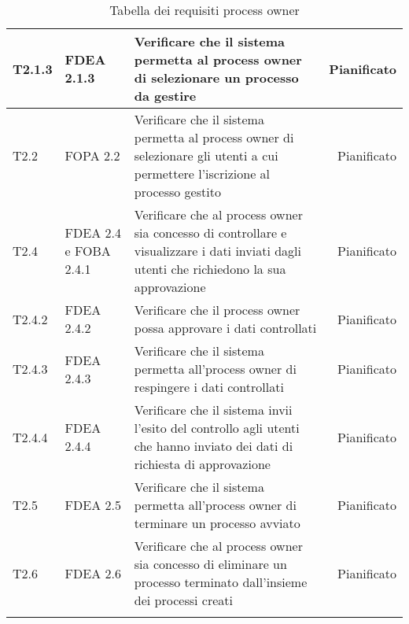 \begin{longtable}{llXr}
\midrule
T2.1.3&FDEA 2.1.3&Verificare che il sistema permetta al process owner di selezionare un processo da gestire&Pianificato\\
\midrule
T2.2&FOPA 2.2&Verificare che il sistema permetta al process owner di selezionare gli utenti a cui permettere l'iscrizione al processo gestito&Pianificato\\
\midrule
T2.4&FDEA 2.4 e FOBA 2.4.1&Verificare che al process owner sia concesso di controllare e visualizzare i dati inviati dagli utenti che richiedono la sua approvazione& Pianificato\\
\midrule
T2.4.2&FDEA 2.4.2&Verificare che il process owner possa approvare i dati controllati&Pianificato\\
\midrule
T2.4.3&FDEA 2.4.3&Verificare che il sistema permetta all'process owner di respingere i dati controllati&Pianificato\\
\midrule
T2.4.4&FDEA 2.4.4&Verificare che il sistema invii l'esito del controllo agli utenti che hanno inviato dei dati di richiesta di approvazione&Pianificato\\
\midrule
T2.5&FDEA 2.5&Verificare che il sistema permetta all'process owner di terminare un processo avviato&Pianificato\\
\midrule
T2.6&FDEA 2.6&Verificare che al process owner sia concesso di eliminare un processo terminato dall'insieme dei processi creati&Pianificato\\ 
\bottomrule
\caption{Tabella dei requisiti process owner}
\end{longtable}
